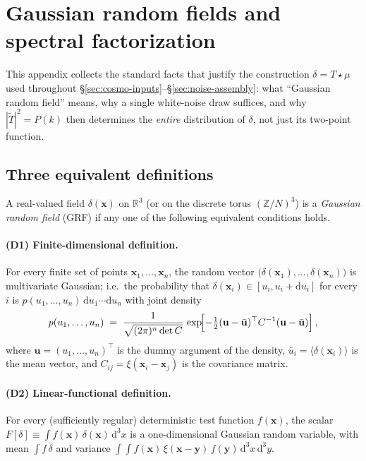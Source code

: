 \documentclass[12pt]{article}
\newcommand{\bx}{\mathbf{x}}
\newcommand{\by}{\mathbf{y}}
\begin{document}
\section{Gaussian random fields and spectral factorization}
\label{app:grf}

This appendix collects the standard facts that justify the
construction $\delta = T \star \mu$ used throughout
\S\ref{sec:cosmo-inputs}--\S\ref{sec:noise-assembly}: what
``Gaussian random field'' means, why a single white-noise draw
suffices, and why $|\tilde T|^2 = P(k)$ then determines the
\emph{entire} distribution of $\delta$, not just its two-point
function.

\subsection{Three equivalent definitions}
\label{sec:grf-def}

A real-valued field $\delta(\bx)$ on $\mathbb{R}^3$ (or on the
discrete torus $(\mathbb{Z}/N)^3$) is a \emph{Gaussian random
field} (GRF) if any one of the following equivalent conditions
holds.

\paragraph{(D1) Finite-dimensional definition.}
For every finite set of points $\bx_1, \dots, \bx_n$, the random
vector $\bigl(\delta(\bx_1), \dots, \delta(\bx_n)\bigr)$ is
multivariate Gaussian; i.e.\ the probability that
$\delta(\bx_i) \in [u_i, u_i + \mathrm d u_i]$ for every $i$ is
$p(u_1,\dots,u_n)\,\mathrm d u_1\cdots\mathrm d u_n$ with joint
density
\begin{equation}
  p(u_1,\dots,u_n) \;=\; \frac{1}{\sqrt{(2\pi)^n\det C}}\,
        \exp\!\Bigl[-\tfrac12 (\mathbf u - \bar{\mathbf u})^\top C^{-1}
                     (\mathbf u - \bar{\mathbf u})\Bigr]\,,
  \label{eq:grf-mvn}
\end{equation}
where $\mathbf u = (u_1,\dots,u_n)^\top$ is the dummy argument of
the density, $\bar u_i = \langle\delta(\bx_i)\rangle$ is the mean
vector, and $C_{ij} = \xi(\bx_i - \bx_j)$ is the covariance matrix.

\paragraph{(D2) Linear-functional definition.}
For every (sufficiently regular) deterministic test function
$f(\bx)$, the scalar
$F[\delta] \equiv \int f(\bx)\,\delta(\bx)\,\mathrm d^3x$ is a
one-dimensional Gaussian random variable, with mean
$\int f\,\bar\delta$ and variance
$\int\!\int f(\bx)\,\xi(\bx-\by)\,f(\by)\,\mathrm d^3x\,\mathrm d^3y$.
\end{document}
